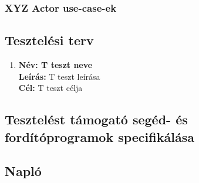         \subsubsection{XYZ Actor use-case-ek} %
		
	    \begin{enumerate}[label=\textbf{\arabic*.}, start=1]
	    \end{enumerate}
	
	\subsection{Tesztelési terv}
		\newcommand{\testitem}[1]{\item \textbf{Név: #1}\\}
		\newcommand{\tdesc}[1]{\textbf{Leírás: } #1\\}
		\newcommand{\tcel}[1]{\textbf{Cél:} #1\\}
	
		\begin{enumerate}[label=\textbf{\arabic*.}, start=1]
		    \testitem{T teszt neve} %
	        \tdesc{T teszt leírása} %
	        \tcel{T teszt célja} %
		\end{enumerate}
	
	\subsection{Tesztelést támogató segéd- és fordítóprogramok specifikálása}		


	\subsection{Napló}

